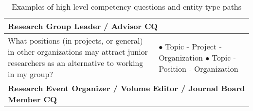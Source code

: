 \begin{table}[]
\caption{Examples of high-level competency questions and entity type paths}
\label{tab:competency-questions}
\begin{tabular}{|p{6cm}|p{6cm}|}
\hline
\multicolumn{2}{|l|}{\textbf{Research Group Leader / Advisor CQ}}                                                                                                                                                                                                                                      \\ \hline
What positions (in projects, or general) in other organizations may attract junior researchers as an alternative to working in my group?                                            & $\bullet$ Topic - Project - Organization \newline $\bullet$ Topic - Position - Organization                                                                                                                     \\ \hline
\multicolumn{2}{|l|}{\textbf{Research Event Organizer / Volume Editor / Journal Board Member CQ}}                                                                                                                                                                                                      \\ \hline

\end{tabular}
\end{table}
